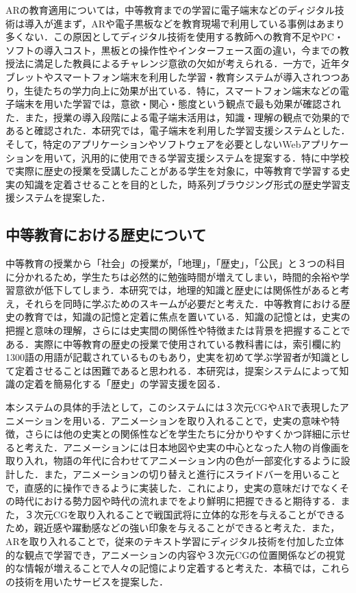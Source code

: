\documentclass[a4paper,dvipdfmx]{hisken}
\begin{document}
ARの教育適用については，中等教育までの学習に電子端末などのディジタル技術は導入が進まず\cite{ifip}\cite{ogawa}\cite{akahori}，ARや電子黒板などを教育現場で利用している事例はあまり多くない\cite{okumura}\cite{kokuban}．この原因としてディジタル技術を使用する教師への教育不足\cite{suzuki}やPC・ソフトの導入コスト\cite{2005}，黒板との操作性やインターフェース面の違い\cite{environment}，今までの教授法に満足した教員によるチャレンジ意欲の欠如\cite{koizumi}が考えられる．一方で，近年タブレットやスマートフォン端末を利用した学習・教育システムが導入されつつあり\cite{hasegawa}，生徒たちの学力向上に効果が出ている\cite{ict}．特に，スマートフォン端末などの電子端末を用いた学習では，意欲・関心・態度という観点で最も効果が確認された．また，授業の導入段階による電子端末活用は，知識・理解の観点で効果的であると確認された．本研究では，電子端末を利用した学習支援システムとした．そして，特定のアプリケーションやソフトウェアを必要としないWebアプリケーションを用いて，汎用的に使用できる学習支援システムを提案する．特に中学校で実際に歴史の授業を受講したことがある学生を対象に，中等教育で学習する史実の知識を定着させることを目的とした，時系列ブラウジング形式の歴史学習支援システムを提案した．

\subsection{中等教育における歴史について}

中等教育の授業から「社会」の授業が，「地理」，「歴史」，「公民」と３つの科目に分かれるため\cite{takezawa}，学生たちは必然的に勉強時間が増えてしまい，時間的余裕や学習意欲が低下してしまう\cite{okano}．本研究では，地理的知識と歴史には関係性があると考え\cite{toida}\cite{terao}，それらを同時に学ぶためのスキームが必要だと考えた．中等教育における歴史の教育では，知識の記憶と定着に焦点を置いている．知識の記憶とは，史実の把握と意味の理解，さらには史実間の関係性や特徴または背景を把握することである\cite{okano}．実際に中等教育の歴史の授業で使用されている教科書には，索引欄に約1300語の用語が記載されている\cite{rekishi}ものもあり，史実を初めて学ぶ学習者が知識として定着させることは困難であると思われる．本研究は，提案システムによって知識の定着を簡易化する「歴史」の学習支援を図る．

本システムの具体的手法として，このシステムには３次元CGやARで表現したアニメーションを用いる．アニメーションを取り入れることで，史実の意味や特徴，さらには他の史実との関係性などを学生たちに分かりやすくかつ詳細に示せると考えた．アニメーションには日本地図や史実の中心となった人物の肖像画を取り入れ，物語の年代に合わせてアニメーション内の色が一部変化するように設計した．また，アニメーションの切り替えと進行にスライドバーを用いることで，直感的に操作できるように実装した．これにより，史実の意味だけでなくその時代における勢力図や時代の流れまでをより鮮明に把握できると期待する．また，３次元CGを取り入れることで戦国武将に立体的な形を与えることができるため，親近感や躍動感などの強い印象を与えることができると考えた．また，ARを取り入れることで，従来のテキスト学習にディジタル技術を付加した立体的な観点で学習でき，アニメーションの内容や３次元CGの位置関係などの視覚的な情報が増えることで人々の記憶により定着すると考えた\cite{hujimoto}．本稿では，これらの技術を用いたサービスを提案した．
\end{document}
